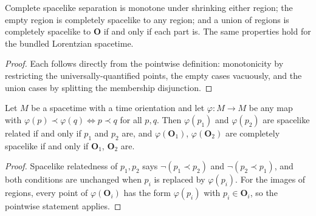 \begin{lemma}
    \label{lmm:completely-spacelike-structural}
    \leanok
    Complete spacelike separation is monotone under shrinking either region; the empty region is completely spacelike to any region; and a union of regions is completely spacelike to $\mathbf{O}$ if and only if each part is. The same properties hold for the bundled Lorentzian spacetime.
\end{lemma}
\begin{proof}
    \leanok
    Each follows directly from the pointwise definition: monotonicity by restricting the universally-quantified points, the empty cases vacuously, and the union cases by splitting the membership disjunction.
\end{proof}

\medskip

\begin{lemma}
    \label{lmm:precedence-preserving-spacelike}
    \leanok
    Let $M$ be a spacetime with a time orientation and let $\varphi : M \to M$ be any map with $\varphi(p) \prec \varphi(q) \iff p \prec q$ for all $p, q$. Then $\varphi(p_1)$ and $\varphi(p_2)$ are spacelike related if and only if $p_1$ and $p_2$ are, and $\varphi(\mathbf{O}_1)$, $\varphi(\mathbf{O}_2)$ are completely spacelike if and only if $\mathbf{O}_1$, $\mathbf{O}_2$ are.
\end{lemma}
\begin{proof}
    \leanok
    Spacelike relatedness of $p_1, p_2$ says $\lnot(p_1 \prec p_2)$ and $\lnot(p_2 \prec p_1)$, and both conditions are unchanged when $p_i$ is replaced by $\varphi(p_i)$. For the images of regions, every point of $\varphi(\mathbf{O}_i)$ has the form $\varphi(p_i)$ with $p_i \in \mathbf{O}_i$, so the pointwise statement applies.
\end{proof}

